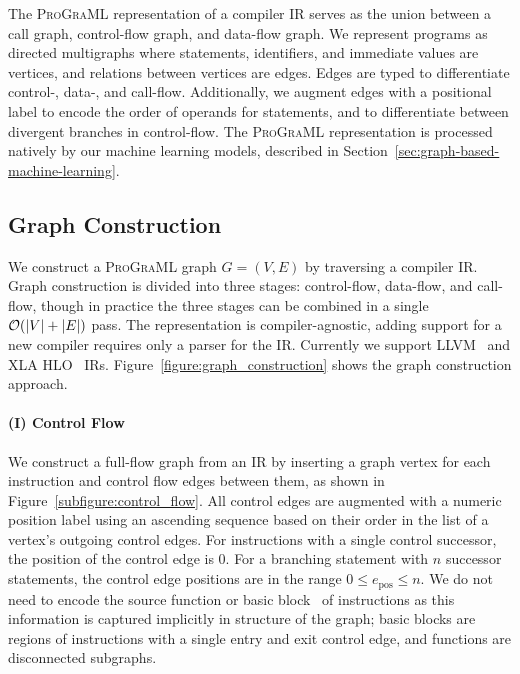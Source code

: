 The \textsc{ProGraML} representation of a compiler IR serves as the
union between a call graph, control-flow graph, and data-flow
graph. We represent programs as directed multigraphs where statements,
identifiers, and immediate values are vertices, and relations between
vertices are edges. Edges are typed to differentiate control-, data-,
and call-flow. Additionally, we augment edges with a positional label
to encode the order of operands for statements, and to differentiate
between divergent branches in control-flow. The \textsc{ProGraML}
representation is processed natively by our machine learning models,
described in Section~\ref{sec:graph-based-machine-learning}.

\subsection{Graph Construction}

We construct a \textsc{ProGraML} graph $G = (V, E)$ by traversing a
compiler IR. Graph construction is divided into three stages:
control-flow, data-flow, and call-flow, though in practice the three
stages can be combined in a single $\mathcal{O}{(|V|+|E|)}$ pass. The
representation is compiler-agnostic, adding support for a new compiler
requires only a parser for the IR. Currently we support
LLVM~\cite{Lattner2004} and XLA HLO~\cite{Leary2017}
IRs. Figure~\ref{figure:graph_construction} shows the graph
construction approach.

\paragraph{(I) Control Flow} We construct a full-flow graph from an IR
by inserting a graph vertex for each instruction and control flow
edges between them, as shown in
Figure~\ref{subfigure:control_flow}. All control edges are augmented
with a numeric position label using an ascending sequence based on
their order in the list of a vertex's outgoing control edges. For
instructions with a single control successor, the position of the
control edge is 0. For a branching statement with $n$ successor
statements, the control edge positions are in the range
$0 \le e_{\text{pos}} \le n$. We do not need to encode the source
function or basic block~\cite{Lattner2004} of instructions as this
information is captured implicitly in structure of the graph; basic
blocks are regions of instructions with a single entry and exit
control edge, and functions are disconnected subgraphs.

